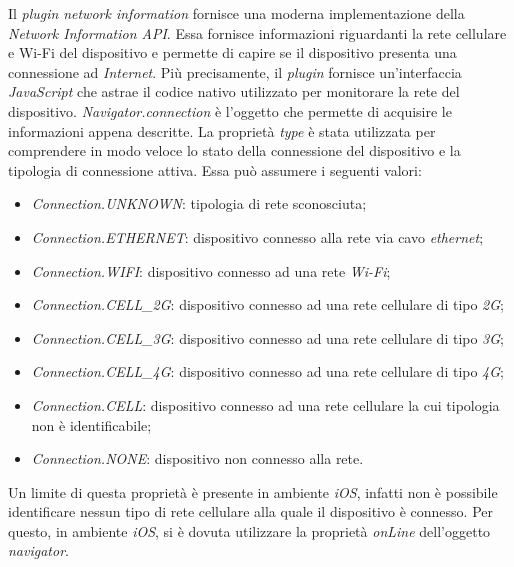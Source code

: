 Il \textit{plugin} \textit{network information} fornisce una moderna implementazione della \textit{Network Information API}. Essa fornisce informazioni riguardanti la rete cellulare e Wi-Fi del dispositivo e permette di capire se il dispositivo presenta una connessione ad \textit{Internet}. Più precisamente, il \textit{plugin} fornisce un'interfaccia \textit{JavaScript} che astrae il codice nativo utilizzato per monitorare la rete del dispositivo. \textit{Navigator.connection} è l'oggetto che permette di acquisire le informazioni appena descritte. La proprietà \textit{type} è stata utilizzata per comprendere in modo veloce lo stato della connessione del dispositivo e la tipologia di connessione attiva. Essa può assumere i seguenti valori:
\begin{itemize}
	\item \textit{Connection.UNKNOWN}: tipologia di rete sconosciuta;
	\item \textit{Connection.ETHERNET}: dispositivo connesso alla rete via cavo \textit{ethernet};
	\item \textit{Connection.WIFI}: dispositivo connesso ad una rete \textit{Wi-Fi};
	\item \textit{Connection.CELL\_2G}: dispositivo connesso ad una rete cellulare di tipo \textit{2G};
	\item \textit{Connection.CELL\_3G}: dispositivo connesso ad una rete cellulare di tipo \textit{3G};
	\item \textit{Connection.CELL\_4G}: dispositivo connesso ad una rete cellulare di tipo \textit{4G};
	\item \textit{Connection.CELL}: dispositivo connesso ad una rete cellulare la cui tipologia non è identificabile;
	\item \textit{Connection.NONE}: dispositivo non connesso alla rete.
\end{itemize}
Un limite di questa proprietà è presente in ambiente \textit{iOS}, infatti non è possibile identificare nessun tipo di rete cellulare alla quale il dispositivo è connesso. Per questo, in ambiente \textit{iOS}, si è dovuta utilizzare la proprietà \textit{onLine} dell'oggetto \textit{navigator}.

